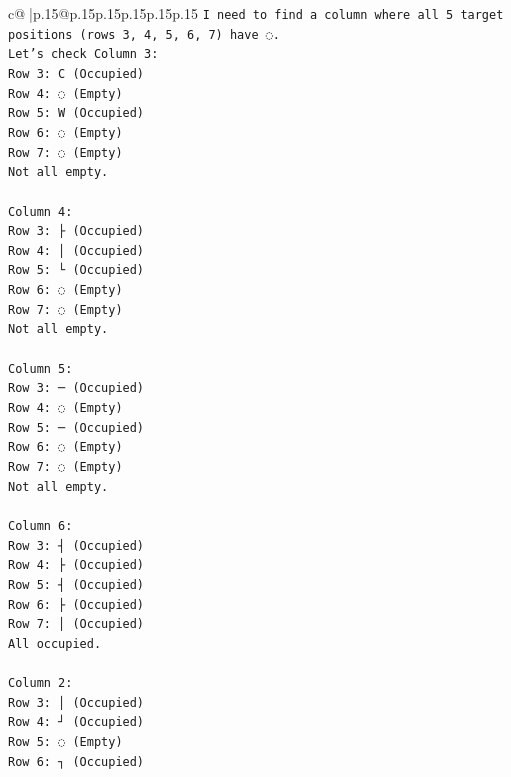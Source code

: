 \documentclass{article}
\begin{document}
{\begin{supertabular}{c@{$\;$}|p{.15\linewidth}@{}p{.15\linewidth}p{.15\linewidth}p{.15\linewidth}p{.15\linewidth}p{.15\linewidth}}
{{{\texttt{I need to find a column where all 5 target positions (rows 3, 4, 5, 6, 7) have ◌.} \\
\texttt{Let's check Column 3:} \\
\texttt{Row 3: C (Occupied)} \\
\texttt{Row 4: ◌ (Empty)} \\
\texttt{Row 5: W (Occupied)} \\
\texttt{Row 6: ◌ (Empty)} \\
\texttt{Row 7: ◌ (Empty)} \\
\texttt{Not all empty.} \\
\\ 
\texttt{Column 4:} \\
\texttt{Row 3: ├ (Occupied)} \\
\texttt{Row 4: │ (Occupied)} \\
\texttt{Row 5: └ (Occupied)} \\
\texttt{Row 6: ◌ (Empty)} \\
\texttt{Row 7: ◌ (Empty)} \\
\texttt{Not all empty.} \\
\\ 
\texttt{Column 5:} \\
\texttt{Row 3: ─ (Occupied)} \\
\texttt{Row 4: ◌ (Empty)} \\
\texttt{Row 5: ─ (Occupied)} \\
\texttt{Row 6: ◌ (Empty)} \\
\texttt{Row 7: ◌ (Empty)} \\
\texttt{Not all empty.} \\
\\ 
\texttt{Column 6:} \\
\texttt{Row 3: ┤ (Occupied)} \\
\texttt{Row 4: ├ (Occupied)} \\
\texttt{Row 5: ┤ (Occupied)} \\
\texttt{Row 6: ├ (Occupied)} \\
\texttt{Row 7: │ (Occupied)} \\
\texttt{All occupied.} \\
\\ 
\texttt{Column 2:} \\
\texttt{Row 3: │ (Occupied)} \\
\texttt{Row 4: ┘ (Occupied)} \\
\texttt{Row 5: ◌ (Empty)} \\
\texttt{Row 6: ┐ (Occupied)} \\
}}}
\end{supertabular}}
\end{document}
